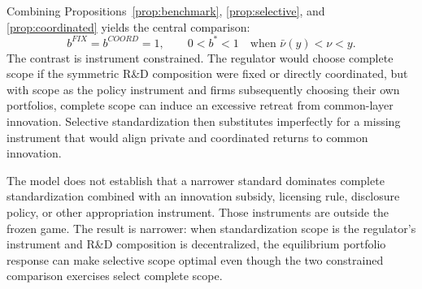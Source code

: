 Combining Propositions~\ref{prop:benchmark}, \ref{prop:selective}, and \ref{prop:coordinated} yields the central comparison:
\begin{equation}
 b^{FIX}=b^{COORD}=1,
 \qquad
 0<b^*<1
 \quad\text{when }\bar\nu(y)<\nu<y.
 \label{eq:centralcomparison}
\end{equation}
The contrast is instrument constrained. The regulator would choose complete scope if the symmetric R\&D composition were fixed or directly coordinated, but with scope as the policy instrument and firms subsequently choosing their own portfolios, complete scope can induce an excessive retreat from common-layer innovation. Selective standardization then substitutes imperfectly for a missing instrument that would align private and coordinated returns to common innovation.

The model does not establish that a narrower standard dominates complete standardization combined with an innovation subsidy, licensing rule, disclosure policy, or other appropriation instrument. Those instruments are outside the frozen game. The result is narrower: when standardization scope is the regulator's instrument and R\&D composition is decentralized, the equilibrium portfolio response can make selective scope optimal even though the two constrained comparison exercises select complete scope.
